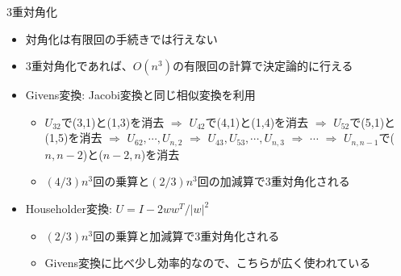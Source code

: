 \begin{frame}[t,fragile]{3重対角化}
  \begin{itemize}
  \item 対角化は有限回の手続きでは行えない
  \item 3重対角化であれば、$O(n^3)$の有限回の計算で決定論的に行える
  \item Givens変換: Jacobi変換と同じ相似変換を利用
    \begin{itemize}
    \item $U_{32}$で(3,1)と(1,3)を消去 $\Rightarrow$ $U_{42}$で(4,1)と(1,4)を消去 $\Rightarrow$ $U_{52}$で(5,1)と(1,5)を消去 $\Rightarrow$ $U_{62},\cdots,U_{n,2}$ $\Rightarrow$ $U_{43},U_{53},\cdots,U_{n,3}$ $\Rightarrow$ $\cdots$ $\Rightarrow$ $U_{n,n-1}$で($n,n-2$)と($n-2,n$)を消去
    \item $(4/3)n^3$回の乗算と$(2/3)n^3$回の加減算で3重対角化される
    \end{itemize}
  \item Householder変換: $U = I - 2 w w^T / |w|^2$
    \begin{itemize}
    \item $(2/3)n^3$回の乗算と加減算で3重対角化される
    \item Givens変換に比べ少し効率的なので、こちらが広く使われている
    \end{itemize}
  \end{itemize}
\end{frame}
